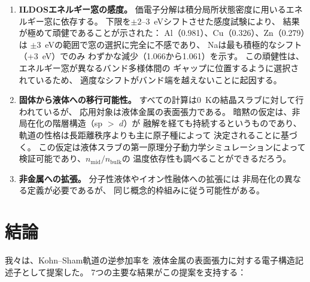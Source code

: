 \documentclass[twocolumn,showpacs,preprintnumbers,amsmath,amssymb,prb]{revtex4-2}
\begin{document}
\begin{enumerate}
  \item \textbf{ILDOSエネルギー窓の感度。}
    価電子分解は積分局所状態密度に用いるエネルギー窓に依存する。
    下限を$\pm 2$--$3$~eVシフトさせた感度試験により、
    結果が極めて頑健であることが示された：
    Al（0.981）、Cu（0.326）、Zn（0.279）は
    $\pm 3$~eVの範囲で窓の選択に完全に不感であり、
    Naは最も積極的なシフト（+3~eV）でのみ
    わずかな減少（1.066から1.061）を示す。
    この頑健性は、エネルギー窓が異なるバンド多様体間の
    ギャップに位置するように選択されているため、
    適度なシフトがバンド端を越えないことに起因する。

  \item \textbf{固体から液体への移行可能性。}
    すべての計算は0~Kの結晶スラブに対して行われているが、
    応用対象は液体金属の表面張力である。
    暗黙の仮定は、非局在化の階層構造（sp $>$ $d$）が
    融解を経ても持続するというものであり、
    軌道の性格は長距離秩序よりも主に原子種によって
    決定されることに基づく。
    この仮定は液体スラブの第一原理分子動力学シミュレーションによって
    検証可能であり、$n_\mathrm{mid}/n_\mathrm{bulk}$の
    温度依存性も調べることができるだろう。

  \item \textbf{非金属への拡張。}
    分子性液体やイオン性融体への拡張には
    非局在化の異なる定義が必要であるが、
    同じ概念的枠組みに従う可能性がある。
\end{enumerate}


\section{結論}
\label{sec:conclusion}

我々は、Kohn--Sham軌道の逆参加率を
液体金属の表面張力に対する電子構造記述子として提案した。
7つの主要な結果がこの提案を支持する：
\end{document}
